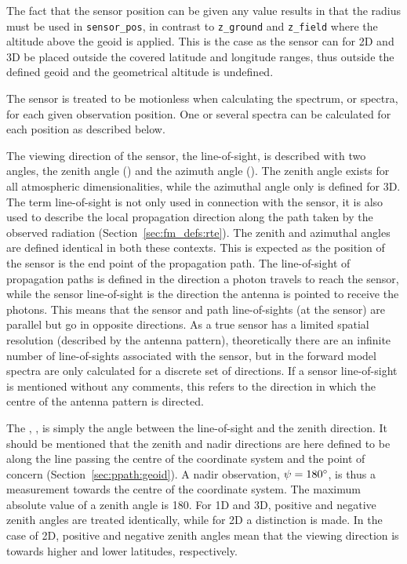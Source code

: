 The fact that the sensor position can be given any value results in
that the radius must be used in \verb|sensor_pos|, in contrast to
\verb|z_ground| and \verb|z_field| where the altitude above the geoid
is applied. This is the case as the sensor can for 2D and 3D be
placed outside the covered latitude and longitude ranges, thus
outside the defined geoid and the geometrical altitude is undefined.

The sensor is treated to be motionless when calculating the spectrum,
or spectra, for each given observation position. One or several
spectra can be calculated for each position as described below.


\label{sec:fm_defs:los}

The viewing direction of the sensor, the line-of-sight, is described
with two angles, the zenith angle (\ZntAng) and the azimuth angle
(\AzmAng). The zenith angle exists for all atmospheric
dimensionalities, while the azimuthal angle only is defined for 3D.
The term line-of-sight is not only used in connection with the sensor,
it is also used to describe the local propagation direction along the
path taken by the observed radiation (Section~\ref{sec:fm_defs:rte}).
The zenith and azimuthal angles are defined identical in both these
contexts. This is expected as the position of the sensor is the end
point of the propagation path. The line-of-sight of propagation paths
is defined in the direction a photon travels to reach the sensor,
while the sensor line-of-sight is the direction the antenna is pointed
to receive the photons. This means that the sensor and path
line-of-sights (at the sensor) are parallel but go in opposite
directions. As a true sensor has a limited spatial resolution
(described by the antenna pattern), theoretically there are an
infinite number of line-of-sights associated with the sensor, but in
the forward model spectra are only calculated for a discrete set of
directions. If a sensor line-of-sight is mentioned without any
comments, this refers to the direction in which the centre of the
antenna pattern is directed.

The , \ZntAng, is simply the angle between the
line-of-sight and the zenith direction. It should be mentioned that
the zenith and nadir directions are here defined to be along the line
passing the centre of the coordinate system and the point of concern
(Section~\ref{sec:ppath:geoid}). A nadir observation,
$\psi=180^\circ$, is thus a measurement towards the centre of the
coordinate system. The maximum absolute value of a zenith angle is
180\degree. For 1D and 3D, positive and negative zenith angles are
treated identically, while for 2D a distinction is made. In the case
of 2D, positive and negative zenith angles mean that the viewing
direction is towards higher and lower latitudes, respectively.


